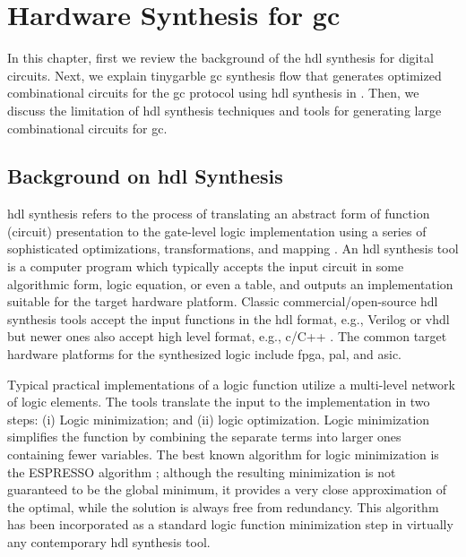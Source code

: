\chapter{Hardware Synthesis for \acrshort{gc}}\label{chap:syn}
In this chapter, first we review the background of the \acrshort{hdl} synthesis for digital circuits.
Next, we explain \gls{tinygarble} \acrshort{gc} synthesis flow that generates optimized combinational circuits for the \acrshort{gc} protocol using \acrshort{hdl} synthesis in .
Then, we discuss the limitation of \acrshort{hdl} synthesis techniques and tools for generating large combinational circuits for \acrshort{gc}.

\section{Background on \acrshort{hdl} Synthesis}\label{sec:syn-back}
\acrshort{hdl} synthesis refers to the process of translating an abstract form of  function (circuit) presentation to the gate-level logic implementation using a series of sophisticated optimizations, transformations, and mapping \cite{sentovich1992sis,micheli1994synthesis,devadas1994logic,brayton1987mis}.
An \acrshort{hdl} synthesis tool is a computer program which typically accepts the input circuit in some algorithmic form, logic equation, or even a table, and outputs an implementation suitable for the target hardware platform.
Classic commercial/open-source \acrshort{hdl} synthesis tools accept the input functions in the \acrshort{hdl} format, e.g., Verilog or \gls{vhdl} \cite{tool:DesignCompiler,tool:ABC,tool:Encounter,tool:HDLdesigner,tool:PandA,decaluwe2004myhdl} but newer ones also accept high level format, e.g., \gls{c}/C++ \cite{Gupta2004, tool:Vivado}.
The common target hardware platforms for the synthesized logic include \acrfull{fpga}, \acrfull{pal}, and \acrfull{asic}.

Typical practical implementations of a logic function utilize a multi-level network of logic elements.
The tools translate the input to the implementation in two steps: (i) Logic minimization; and (ii) logic optimization.
Logic minimization simplifies the function by combining the separate terms into larger ones containing fewer variables.
The best known algorithm for logic minimization is the ESPRESSO algorithm \cite{brayton1984logic}; although the resulting minimization is not guaranteed to be the global minimum, it provides a very close approximation of the optimal, while the solution is always free from redundancy.
This algorithm has been incorporated as a standard logic function minimization step in virtually any contemporary \acrshort{hdl} synthesis tool.

